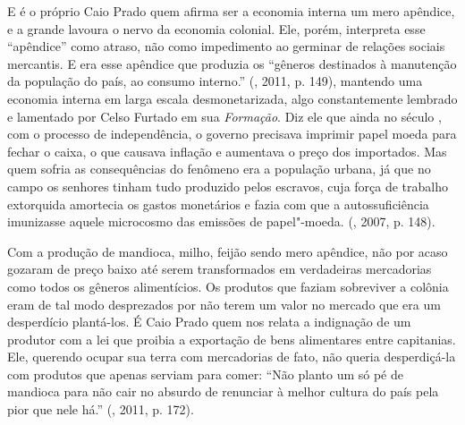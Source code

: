 E é o próprio Caio Prado quem afirma ser a economia interna um mero
apêndice, e a grande lavoura o nervo da economia colonial. Ele, porém,
interpreta esse ``apêndice'' como atraso, não como impedimento ao
germinar de relações sociais mercantis. E era esse apêndice que produzia
os ``gêneros destinados à manutenção da população do país, ao consumo
interno.'' (, 2011, p. 149), mantendo uma economia
interna em larga escala desmonetarizada, algo constantemente lembrado e
lamentado por Celso Furtado em sua \emph{Formação}. Diz ele que ainda no
século , com o processo de independência, o governo precisava
imprimir papel moeda para fechar o caixa, o que causava inflação e
aumentava o preço dos importados. Mas quem sofria as consequências do
fenômeno era a população urbana, já que no campo os senhores tinham tudo
produzido pelos escravos, cuja força de trabalho extorquida amortecia os
gastos monetários e fazia com que a autossuficiência imunizasse aquele
microcosmo das emissões de papel"-moeda. (, 2007, p. 148).

Com a produção de mandioca, milho, feijão sendo mero apêndice, não por
acaso gozaram de preço baixo até serem transformados em verdadeiras
mercadorias como todos os gêneros alimentícios. Os produtos que faziam
sobreviver a colônia eram de tal modo desprezados por não terem um valor
no mercado que era um desperdício plantá-los. É Caio Prado quem nos
relata a indignação de um produtor com a lei que proibia a exportação de
bens alimentares entre capitanias. Ele, querendo ocupar sua terra com
mercadorias de fato, não queria desperdiçá-la com produtos que apenas
serviam para comer: ``Não planto um só pé de mandioca para não cair no
absurdo de renunciar à melhor cultura do país pela pior que nele há.''
(, 2011, p. 172).

